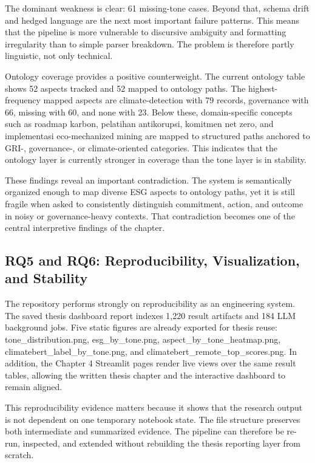 The dominant weakness is clear: 61 missing-tone cases. Beyond that, schema drift and hedged language are the next most important failure patterns. This means that the pipeline is more vulnerable to discursive ambiguity and formatting irregularity than to simple parser breakdown. The problem is therefore partly linguistic, not only technical.

Ontology coverage provides a positive counterweight. The current ontology table shows 52 aspects tracked and 52 mapped to ontology paths. The highest-frequency mapped aspects are climate-detection with 79 records, governance with 66, missing with 60, and none with 23. Below these, domain-specific concepts such as roadmap karbon, pelatihan antikorupsi, komitmen net zero, and implementasi eco-mechanized mining are mapped to structured paths anchored to GRI-, governance-, or climate-oriented categories. This indicates that the ontology layer is currently stronger in coverage than the tone layer is in stability.

These findings reveal an important contradiction. The system is semantically organized enough to map diverse ESG aspects to ontology paths, yet it is still fragile when asked to consistently distinguish commitment, action, and outcome in noisy or governance-heavy contexts. That contradiction becomes one of the central interpretive findings of the chapter.
\subsection{RQ5 and RQ6: Reproducibility, Visualization, and Stability}

The repository performs strongly on reproducibility as an engineering system. The saved thesis dashboard report indexes 1,220 result artifacts and 184 LLM background jobs. Five static figures are already exported for thesis reuse: tone\_distribution.png, esg\_by\_tone.png, aspect\_by\_tone\_heatmap.png, climatebert\_label\_by\_tone.png, and climatebert\_remote\_top\_scores.png. In addition, the Chapter 4 Streamlit pages render live views over the same result tables, allowing the written thesis chapter and the interactive dashboard to remain aligned.

This reproducibility evidence matters because it shows that the research output is not dependent on one temporary notebook state. The file structure preserves both intermediate and summarized evidence. The pipeline can therefore be re-run, inspected, and extended without rebuilding the thesis reporting layer from scratch.

